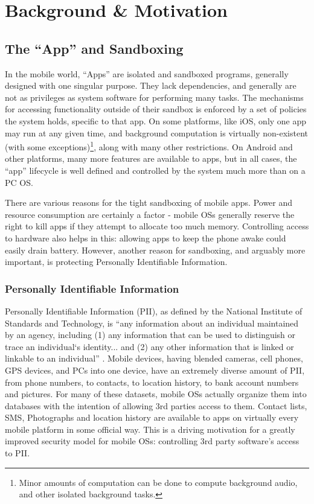 \chapter{Background \& Motivation}
\label{sec:background}


\section{The ``App'' and Sandboxing}

In the mobile world, ``Apps'' are isolated and sandboxed programs, generally designed with one singular purpose. They lack dependencies, and generally are not as privileges as system software for performing many tasks. The mechanisms for accessing functionality outside of their sandbox is enforced by a set of policies the system holds, specific to that app. On some platforms, like iOS, only one app may run at any given time, and background computation is virtually non-existent (with some exceptions)\footnote{Minor amounts of computation can be done to compute background audio, and other isolated background tasks.}, along with many other restrictions. On Android and other platforms, many more features are available to apps, but in all cases, the ``app'' lifecycle is well defined and controlled by the system much more than on a PC OS.

There are various reasons for the tight sandboxing of mobile apps. Power and resource consumption are certainly a factor - mobile OSs generally reserve the right to kill apps if they attempt to allocate too much memory. Controlling access to hardware also helps in this: allowing apps to keep the phone awake could easily drain battery. However, another reason for sandboxing, and arguably more important, is protecting Personally Identifiable Information.

\subsection{Personally Identifiable Information}

Personally Identifiable Information (PII), as defined by the National Institute of Standards and Technology, is ``any information about an individual maintained by an agency, including (1) any information that can be used to distinguish or trace an individual‘s identity... and (2) any other information that is linked or linkable to an individual'' \citep{mccallister2010guide}. Mobile devices, having blended cameras, cell phones, GPS devices, and PCs into one device, have an extremely diverse amount of PII, from phone numbers, to contacts, to location history, to bank account numbers and pictures. For many of these datasets, mobile OSs actually organize them into databases with the intention of allowing 3rd parties access to them. Contact lists, SMS, Photographs and location history are available to apps on virtually every mobile platform in some official way. This is a driving motivation for a greatly improved security model for mobile OSs: controlling 3rd party software's access to PII. 


